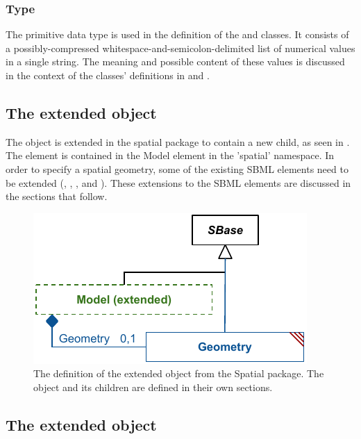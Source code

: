 \subsubsection{Type \fixttspace{}}
\label{primtype-arrayData}

The  primitive data type is used in the definition of the \SampledField and \ParametricObject classes.  It consists of a possibly-compressed whitespace-and-semicolon-delimited list of numerical values in a single string.  The meaning and possible content of these values is discussed in the context of the classes' definitions in  and .



\subsection{The extended \Model object}
\label{extended-model-class}
The \Model object is extended in the spatial package to contain a new \Geometry child, as seen in
. The \Geometry element is contained in the Model element in the 'spatial' namespace. In order to specify a spatial geometry, some of the existing SBML elements need to be extended (\Compartment, \Species, \Parameter, and \Reaction). These extensions to the SBML elements are discussed in the sections that follow.
 
\begin{figure}[ht]
  \includegraphics{figs/extended-model-uml}
  \caption{The definition of the extended \Model object from the Spatial package.  The \Geometry object and its children are defined in their own sections.}
  \label{model-uml}
\end{figure}




\subsection{The extended \Compartment object}
\label{extended-compartment-class}

